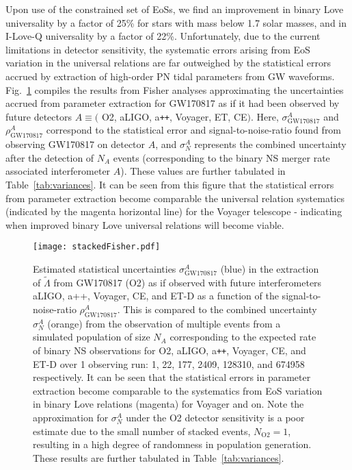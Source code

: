 \documentclass[prd,twocolumn,nofootinbib,superscriptaddress,amsmath,amssymb]{revtex4-1}
\begin{document}
Upon use of the constrained set of EoSs, we find an improvement in binary Love universality by a factor of 25\% for stars with mass below 1.7 solar masses, and in I-Love-Q universality by a factor of 22\%.
Unfortunately, due to the current limitations in detector sensitivity, the systematic errors arising from EoS variation in the universal relations are far outweighed by the statistical errors accrued by extraction of high-order PN tidal parameters from GW waveforms.
Fig.~\ref{fig:stackedFisher} compiles the results from Fisher analyses approximating the uncertainties accrued from parameter extraction for GW170817 as if it had been observed by future detectors $A \equiv ($ O2, aLIGO, a\texttt{++}, Voyager, ET, CE$)$.
Here, $\sigma^A_{\text{GW170817}}$ and $\rho^A_{\text{GW170817}}$ correspond to the statistical error and signal-to-noise-ratio found from observing GW170817 on detector $A$, and $\sigma^A_N$ represents the combined uncertainty after the detection of $N_A$ events (corresponding to the binary NS merger rate associated interferometer $A$).
These values are further tabulated in Table~\ref{tab:variances}.
It can be seen from this figure that the statistical errors from parameter extraction become comparable the universal relation systematics (indicated by the magenta horizontal line) for the Voyager telescope - indicating when improved binary Love universal relations will become viable.
\begin{figure}
\begin{center} 
\texttt{[image: stackedFisher.pdf]}
\end{center}
\caption{
Estimated statistical uncertainties $\sigma^A_{\text{GW170817}}$ (blue) in the extraction of $\tilde{\Lambda}$ from GW170817 (O2) as if observed with future interferometers aLIGO, a++, Voyager, CE, and ET-D as a function of the signal-to-noise-ratio $\rho^A_{\text{GW170817}}$.
This is compared to the combined uncertainty $\sigma^A_N$ (orange) from the observation of multiple events from a simulated population of size $N_A$ corresponding to the expected rate of binary NS observations for O2, aLIGO, a\texttt{++}, Voyager, CE, and ET-D over 1 observing run: 1, 22, 177, 2409, 128310, and 674958 respectively.
It can be seen that the statistical errors in parameter extraction become comparable to the systematics from EoS variation in binary Love relations (magenta) for Voyager and on.
Note the approximation for $\sigma^A_N$ under the O2 detector sensitivity is a poor estimate due to the small number of stacked events, $N_{\text{O2}}=1$, resulting in a high degree of randomness in population generation.
These results are further tabulated in Table~\ref{tab:variances}.
}
\label{fig:stackedFisher}
\end{figure} 
\end{document}
